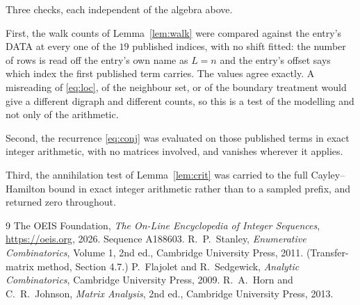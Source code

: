 \documentclass[11pt,a4paper]{article}
\theoremstyle{plain}
\theoremstyle{definition}
\begin{document}
Three checks, each independent of the algebra above.

First, the walk counts of Lemma~\ref{lem:walk} were compared against the entry's DATA at
every one of the $19$ published indices, with no shift fitted: the number of rows is
read off the entry's own name as $L=n$ and the entry's offset says which index the first
published term carries. The values agree exactly. A misreading of \eqref{eq:loc}, of the
neighbour set, or of the boundary treatment would give a different digraph and different
counts, so this is a test of the modelling and not only of the arithmetic.

Second, the recurrence \eqref{eq:conj} was evaluated on those published terms in exact
integer arithmetic, with no matrices involved, and vanishes wherever it applies.

Third, the annihilation test of Lemma~\ref{lem:crit} was carried to the full
Cayley--Hamilton bound in exact integer arithmetic rather than to a sampled prefix, and
returned zero throughout.

\begin{thebibliography}{9}
 The OEIS Foundation, \emph{The On-Line Encyclopedia of Integer
Sequences}, \url{https://oeis.org}, 2026. Sequence A188603.
 R.~P.~Stanley, \emph{Enumerative Combinatorics}, Volume 1, 2nd ed.,
Cambridge University Press, 2011. (Transfer-matrix method, Section 4.7.)
 P.~Flajolet and R.~Sedgewick, \emph{Analytic Combinatorics}, Cambridge
University Press, 2009.
 R.~A.~Horn and C.~R.~Johnson, \emph{Matrix Analysis}, 2nd ed., Cambridge
University Press, 2013.
\end{thebibliography}
\end{document}
